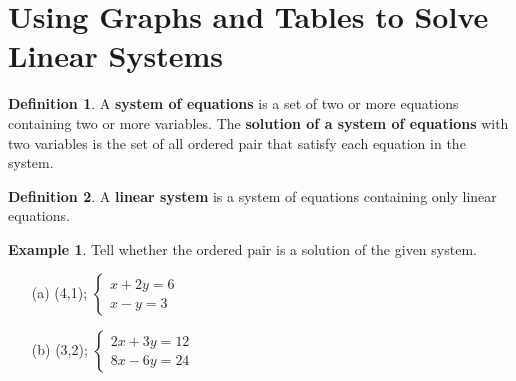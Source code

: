 \documentclass{report}
\theoremstyle{definition}
\newtheorem{example}{\bf Example}
\newtheorem{definition}{\bf Definition}[section]
\begin{document}
\section{    Using Graphs and Tables to Solve Linear Systems   }
\setcounter{example}{0}
\setcounter{definition}{0}


 
\begin{definition}
     A \textbf{system of equations} is a set of two or more equations containing two or more variables. The \textbf{solution of a system of equations} with two variables is the set of all ordered pair that satisfy each equation in the system.
\end{definition}

\begin{definition}
A \textbf{linear system} is a system of equations containing only linear equations.
\end{definition}


\begin{example}
    Tell whether the ordered pair is a solution of the given system.
\end{example}


\begin{minipage}{0.45\linewidth}
\begin{itemize}
    \item[(a)] (4,1); 
        $\begin{cases}
            x+2y=6\\ 
            x-y=3   
        \end{cases}$\\ \vspace{1cm}
\end{itemize}
\end{minipage}
\begin{minipage}{0.45\linewidth}
\begin{itemize}
    \item[(b)] (3,2); 
        $\begin{cases}
            2x+3y=12\\ 
            8x-6y=24   
        \end{cases}$\\ \vspace{1cm}
\end{itemize}
\end{minipage}
\end{document}
